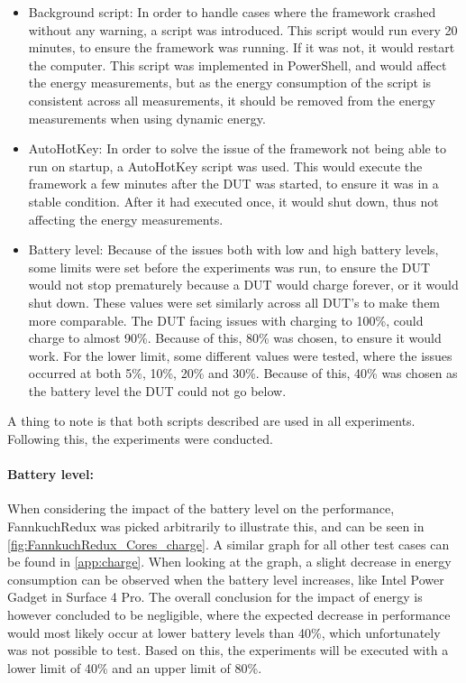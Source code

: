 \begin{itemize}
    \item Background script: In order to handle cases where the framework crashed without any warning, a script was introduced. This script would run every 20 minutes, to ensure the framework was running. If it was not, it would restart the computer. This script was implemented in PowerShell, and would affect the energy measurements, but as the energy consumption of the script is consistent across all measurements, it should be removed from the energy measurements when using dynamic energy.
    \item AutoHotKey: In order to solve the issue of the framework not being able to run on startup, a AutoHotKey script was used. This would execute the framework a few minutes after the DUT was started, to ensure it was in a stable condition. After it had executed once, it would shut down, thus not affecting the energy measurements.
    \item Battery level: Because of the issues both with low and high battery levels, some limits were set before the experiments was run, to ensure the DUT would not stop prematurely because a DUT would charge forever, or it would shut down. These values were set similarly across all DUT's to make them more comparable. The DUT facing issues with charging to 100\%, could charge to almost 90\%. Because of this, 80\% was chosen, to ensure it would work. For the lower limit, some different values were tested, where the issues occurred at both 5\%, 10\%, 20\% and 30\%. Because of this, 40\% was chosen as the battery level the DUT could not go below.
\end{itemize}

A thing to note is that both scripts described are used in all experiments. Following this, the experiments were conducted.



\paragraph{Battery level:} When considering the impact of the battery level on the performance, FannkuchRedux was picked arbitrarily to illustrate this, and can be seen in \cref{fig:FannkuchRedux_Cores_charge}. A similar graph for all other test cases can be found in \cref*{app:charge}. When looking at the graph, a slight decrease in energy consumption can be observed when the battery level increases, like Intel Power Gadget in Surface 4 Pro. The overall conclusion for the impact of energy is however concluded to be negligible, where the expected decrease in performance would most likely occur at lower battery levels than 40\%, which unfortunately was not possible to test. Based on this, the experiments will be executed with a lower limit of 40\% and an upper limit of 80\%.

